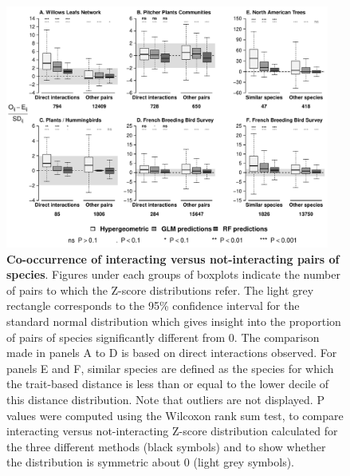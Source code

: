 \begin{figure}
\centering
\includegraphics[width=0.95000\textwidth]{chapitre3/figIntVsNoint.pdf}
\caption{\textbf{Co-occurrence of interacting versus not-interacting
pairs of species}. Figures under each groups of boxplots indicate the
number of pairs to which the Z-score distributions refer. The light grey
rectangle corresponds to the 95\% confidence interval for the standard
normal distribution which gives insight into the proportion of pairs of
species significantly different from 0. The comparison made in panels A
to D is based on direct interactions observed. For panels E and F,
similar species are defined as the species for which the trait-based
distance is less than or equal to the lower decile of this distance
distribution. Note that outliers are not displayed. P values were
computed using the Wilcoxon rank sum test, to compare interacting versus
not-interacting Z-score distribution calculated for the three different
methods (black symbols) and to show whether the distribution is
symmetric about 0 (light grey symbols).\label{fig:synth}}
\end{figure}

\newpage

